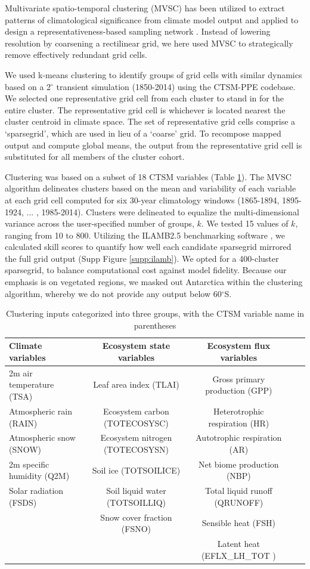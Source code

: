 \documentclass[draft]{agujournal2019}
\begin{document}
Multivariate spatio-temporal clustering (MVSC) has been utilized to extract patterns of climatological significance from climate model output \cite{hoffman2005} and applied to design a representativeness-based sampling network \cite{hoffman2013}. Instead of lowering resolution by coarsening a rectilinear grid, we here used MVSC to strategically remove effectively redundant grid cells.

We used k-means clustering to identify groups of grid cells with similar dynamics based on a 2$^\circ$ transient simulation (1850-2014) using the CTSM-PPE codebase. We selected one representative grid cell from each cluster to stand in for the entire cluster. The representative grid cell is whichever is located nearest the cluster centroid in climate space. The set of representative grid cells comprise a `sparsegrid', which are used in lieu of a `coarse' grid. To recompose mapped output and compute global means, the output from the representative grid cell is substituted for all members of the cluster cohort.

Clustering was based on a subset of 18 CTSM variables (Table \ref{tab:sg}). The MVSC algorithm delineates clusters based on the mean and variability of each variable at each grid cell computed for six 30-year climatology windows (1865-1894, 1895-1924, ... , 1985-2014). Clusters were delineated to equalize the multi-dimensional variance across the user-specified number of groups, $k$. We tested 15 values of $k$, ranging from 10 to 800. Utilizing the ILAMB2.5 benchmarking software \cite{collier2018}, we calculated skill scores to quantify how well each candidate sparsegrid mirrored the full grid output (Supp Figure \ref{supp:ilamb}). We opted for a 400-cluster sparsegrid, to balance computational cost against model fidelity. Because our emphasis is on vegetated regions, we masked out Antarctica within the clustering algorithm, whereby we do not provide any output below 60$^\circ$S.

\begin{table}[h]
\caption{Clustering inputs categorized into three groups, with the CTSM variable name in parentheses}
\centering
\begin{tabular}{l c c c c}
 \hline
 Climate variables & Ecosystem state variables &Ecosystem flux variables \\
 \hline
 2m air temperature (TSA) & Leaf area index (TLAI) & Gross primary production (GPP) \\
Atmospheric rain (RAIN) & Ecosystem carbon (TOTECOSYSC) &Heterotrophic respiration (HR) \\
Atmospheric snow (SNOW) &  Ecosystem nitrogen (TOTECOSYSN) &Autotrophic respiration (AR) \\
2m specific humidity (Q2M) & Soil ice (TOTSOILICE) &Net biome production (NBP) \\
Solar radiation (FSDS) & Soil liquid water (TOTSOILLIQ) & Total liquid runoff (QRUNOFF) \\
& Snow cover fraction (FSNO) & Sensible heat  (FSH) \\
&&Latent heat (EFLX\_LH\_TOT ) \\
 \hline
 \end{tabular}
 \label{tab:sg}
 \end{table}
\end{document}
